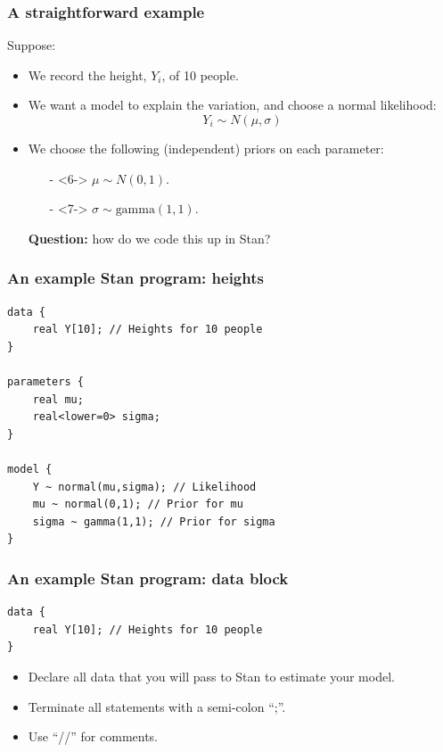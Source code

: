 \documentclass[handout]{beamer}
\begin{document}
\begin{frame}
\frametitle{A straightforward example}
Suppose:
\begin{itemize}
\item<2-> We record the height, $Y_i$, of 10 people.
\item<3-> We want a model to explain the variation, and choose a normal likelihood:
\begin{equation}
Y_i \sim N(\mu,\sigma)
\end{equation}
\item<5-> We choose the following (independent) priors on each parameter:
\begin{itemize}
\item[-]<6-> $\mu\sim N(0,1)$.
\item[-]<7-> $\sigma\sim \text{gamma}(1,1)$.
\end{itemize}

\textbf{Question:} how do we code this up in Stan?
\end{itemize}

\end{frame}

\begin{frame}[fragile]
\frametitle{An example Stan program: heights}
	\begin{verbatim}
data {
    real Y[10]; // Heights for 10 people
}

parameters {
    real mu;
    real<lower=0> sigma;
}

model {
    Y ~ normal(mu,sigma); // Likelihood
    mu ~ normal(0,1); // Prior for mu
    sigma ~ gamma(1,1); // Prior for sigma
}
	\end{verbatim}

\end{frame}

\begin{frame}[fragile]
\frametitle{An example Stan program: data block}
\begin{verbatim}
data {
    real Y[10]; // Heights for 10 people
}
\end{verbatim}

\begin{itemize}
\item<2-> Declare all data that you will pass to Stan to estimate your model.
\item<3-> Terminate all statements with a semi-colon ``;''.
\item<4-> Use ``//'' for comments.
\end{itemize}

\end{frame}
\end{document}
